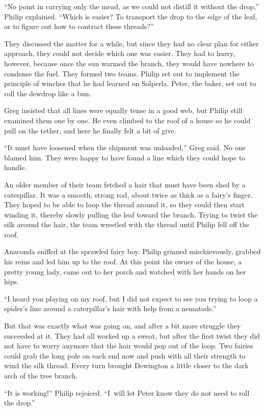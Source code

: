 \documentclass[10pt]{memoir}
\begin{document}
``No point in carrying only the mead, as we could not distill it without the
drop,'' Philip explained. ``Which is easier? To transport the drop to the edge
of the leaf, or to figure out how to contract these threads?''

They discussed the matter for a while, but since they had no clear plan for
either approach, they could not decide which one was easier. They had to hurry,
however, because once the sun warmed the branch, they would have nowhere to
condense the fuel. They formed two teams. Philip set out to implement the
principle of winches that he had learned on Solperla. Peter, the baker, set out
to roll the dewdrop like a bun.

Greg insisted that all lines were equally tense in a good web, but Philip still
examined them one by one. He even climbed to the roof of a house so he could
pull on the tether, and here he finally felt a bit of give.

``It must have loosened when the shipment was unloaded,'' Greg said. No one
blamed him. They were happy to have found a line which they could hope to
handle.

An older member of their team fetched a hair that must have been shed by a
caterpillar. It was a smooth, strong rod, about twice as thick as a fairy's
finger. They hoped to be able to loop the thread around it, so they could then
start winding it, thereby slowly pulling the leaf toward the branch. Trying to
twist the silk around the hair, the team wrestled with the thread until Philip
fell off the roof.

Anaconda sniffed at the sprawled fairy boy. Philip grinned mischievously,
grabbed his reins and led him up to the roof. At this point the owner of the
house, a pretty young lady, came out to her porch and watched with her hands on
her hips.

``I heard you playing on my roof, but I did not expect to see you trying to
loop a spider's line around a caterpillar's hair with help from a nematode.''

But that was exactly what was going on, and after a bit more struggle they
succeeded at it. They had all worked up a sweat, but after the first twist they
did not have to worry anymore that the hair would pop out of the loop. Two
fairies could grab the long pole on each end now and push with all their
strength to wind the silk thread. Every turn brought Dewington a little closer
to the dark arch of the tree branch.

``It is working!'' Philip rejoiced. ``I~will let Peter know they do not need to
roll the drop.''
\end{document}
